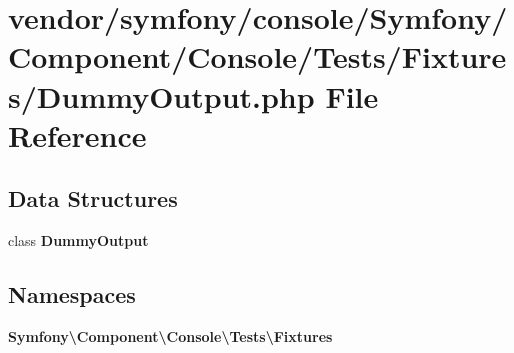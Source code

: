 \section{vendor/symfony/console/\+Symfony/\+Component/\+Console/\+Tests/\+Fixtures/\+Dummy\+Output.php File Reference}
\label{_dummy_output_8php}
\subsection*{Data Structures}
\begin{DoxyCompactItemize}
\item 
class {\bf Dummy\+Output}
\end{DoxyCompactItemize}
\subsection*{Namespaces}
\begin{DoxyCompactItemize}
\item 
 {\bf Symfony\textbackslash{}\+Component\textbackslash{}\+Console\textbackslash{}\+Tests\textbackslash{}\+Fixtures}
\end{DoxyCompactItemize}

